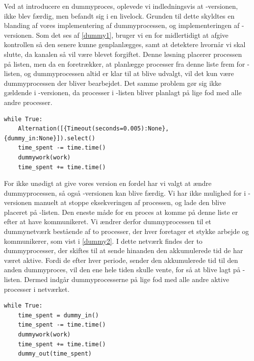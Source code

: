 Ved at introducere en dummyproces, oplevede vi indledningsvis at -versionen, ikke blev færdig, men befandt sig i en  livelock. Grunden til dette skyldtes  en blanding af vores implementering af dummyprocessen, og implementeringen af -versionen. Som det ses af \cref{dummy1}, bruger vi en  for midlertidigt at afgive kontrollen så den senere kunne genplanlægges, samt at detektere hvornår vi skal slutte, da kanalen så vil være blevet forgiftet.
Denne løsning placerer processen på listen, men da \sched en foretrækker, at planlægge processer fra denne liste frem for -listen, og dummyprocessen altid er klar til at blive udvalgt, vil det kun være dummyprocessen der bliver bearbejdet. Det samme problem gør sig ikke gældende i -versionen, da processer i -listen bliver planlagt på lige fod med alle andre processer.

\begin{lstlisting}[firstnumber=1,float=hbtp, label=dummy1, caption=Uddrag af Dummyproces]
while True:
    Alternation([{Timeout(seconds=0.005):None}, {dummy_in:None}]).select()
    time_spent -= time.time()
    dummywork(work)
    time_spent += time.time()          
\end{lstlisting}

For ikke unødigt at give vores version en fordel har vi valgt at ændre dummyprocessen, så også -versionen kan blive færdig. Vi har ikke mulighed for i -versionen manuelt at stoppe eksekveringen af processen, og lade den  blive placeret på -listen. Den eneste måde for en proces at komme på denne liste er efter at have kommunikeret. Vi ændrer derfor dummyprocessen til et dummynetværk bestående af to processer, der hver foretager et stykke arbejde og kommunikerer, som vist i \cref{dummy2}. I dette netværk findes der to dummyprocesser, der skiftes til at sende hinanden den akkumulerede tid de har været aktive. Fordi de efter hver periode, sender den akkumulerede tid til den anden dummyproces, vil den ene hele tiden skulle vente, for så at blive lagt på -listen. Dermed  indgår dummyprocesserne  på lige fod med alle andre aktive processer i netværket.
\begin{lstlisting}[firstnumber=1 ,float=hbtp, label=dummy2, caption=Uddrag Dummynetværk]
while True:
    time_spent = dummy_in()
    time_spent -= time.time()
    dummywork(work)
    time_spent += time.time()
    dummy_out(time_spent)  
\end{lstlisting}



